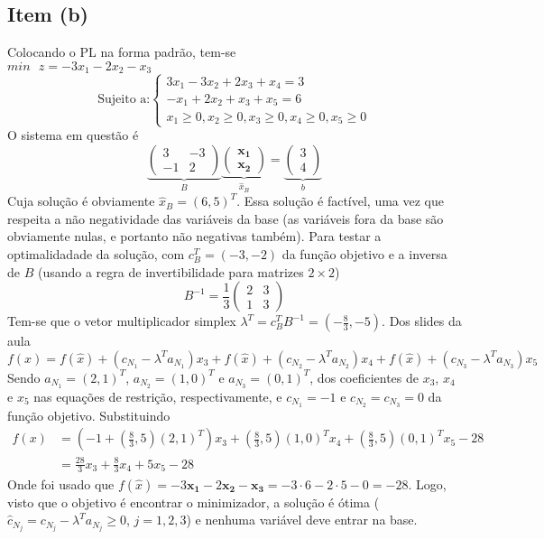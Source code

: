 \documentclass[a4paper, 12pt]{article}
\begin{document}
\subsection{Item (b)}
Colocando o PL na forma padrão, tem-se
\\$min\text{ }z=-3x_1-2x_2-x_3$
\[
\text{Sujeito a:}\left\{
\begin{array}{l}
3x_1-3x_2+2x_3+x_4=3\\
-x_1+2x_2+x_3+x_5=6\\
x_1\geq 0, x_2\geq 0, x_3\geq 0, x_4\geq 0, x_5\geq 0
\end{array}
\right.
\]
O sistema em questão é
\[
\underbrace{
\begin{pmatrix}
3&-3\\
-1&2
\end{pmatrix}}_B
\underbrace{
\begin{pmatrix}
\mathbf{x_1}\\
\mathbf{x_2}
\end{pmatrix}}_{\hat{x}_B}
=
\underbrace{
\begin{pmatrix}
3\\
4
\end{pmatrix}}_{b}
\]
Cuja solução é obviamente $\hat{x}_B=(6, 5)^T$. Essa solução é factível, uma vez que respeita a não negatividade das variáveis da base (as variáveis fora da base são obviamente nulas, e portanto não negativas também). Para testar a optimalidadade da solução, com $c^T_B=(-3, -2)$ da função objetivo e a inversa de $B$ (usando a regra de invertibilidade para matrizes $2\times 2$)
\[
B^{-1}=\frac{1}{3}
\begin{pmatrix}
2&3\\
1&3
\end{pmatrix}
\]
Tem-se que o vetor multiplicador simplex $\lambda^T=c^T_BB^{-1}=(-\frac{8}{3}, -5)$. Dos slides da aula
\[
f(x)=f(\hat{x})+(c_{N_1}-\lambda^T a_{N_1})x_3+f(\hat{x})+(c_{N_2}-\lambda^T a_{N_2})x_4+f(\hat{x})+(c_{N_3}-\lambda^T a_{N_3})x_5
\]
Sendo $a_{N_1}=(2, 1)^T$, $a_{N_2}=(1, 0)^T$ e $a_{N_3}=(0, 1)^T$, dos coeficientes de $x_3$, $x_4$ e $x_5$ nas equações de restrição, respectivamente, e $c_{N_1}=-1$ e $c_{N_2}=c_{N_3}=0$ da função objetivo. Substituindo
\begin{align}
f(x)&=(-1+(\frac{8}{3}, 5)(2, 1)^T)x_3+(\frac{8}{3}, 5)(1, 0)^Tx_4+(\frac{8}{3}, 5)(0, 1)^Tx_5-28 \nonumber \\
&=\frac{28}{3}x_3+\frac{8}{3}x_4+5x_5-28 \nonumber
\end{align}
Onde foi usado que $f(\hat{x})=-3\mathbf{x_1}-2\mathbf{x_2}-\mathbf{x_3}=-3\cdot6-2\cdot5-0=-28$. Logo, visto que o objetivo é encontrar o minimizador, a solução é ótima ($\hat{c}_{N_j}=c_{N_j}-\lambda^T a_{N_j}\geq0$, $j=1,2,3$) e nenhuma variável deve entrar na base.
\end{document}
